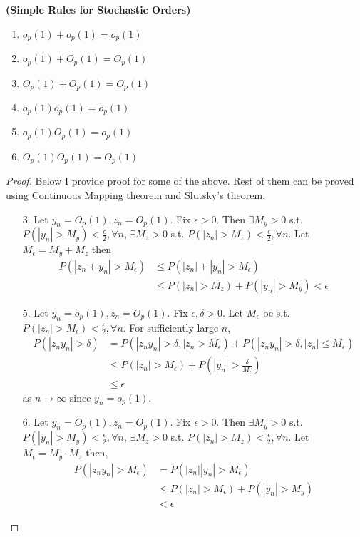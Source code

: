 \documentclass[11pt]{article} %
\theoremstyle{definition}
\numberwithin{defn}{subsection}
\numberwithin{thm}{subsection}
\numberwithin{ex}{subsection}
\newcommand{\ninfty}{n\rightarrow\infty}
\begin{document}
\begin{thm}\label{thm:simplerulesforstochasticorders}
	\textbf{(Simple Rules for Stochastic Orders)}
	\begin{enumerate}
		\item $o_p(1)+o_p(1)=o_p(1)$
		\item $o_p(1)+O_p(1)=O_p(1)$
		\item $O_p(1)+O_p(1)=O_p(1)$
		\item $o_p(1)o_p(1)=o_p(1)$
		\item $o_p(1)O_p(1)=o_p(1)$
		\item $O_p(1)O_p(1)=O_p(1)$
	\end{enumerate}
	\begin{proof}\leavevmode
		Below I provide proof for some of the above. Rest of them can be proved using Continuous Mapping theorem and Slutsky's theorem.
		\begin{itemize}
			\item[3.] Let $y_n=O_p(1),z_n=O_p(1).$ Fix $\epsilon>0$. Then $\exists M_y>0$ s.t. $P(|y_n|>M_y)<\frac{\epsilon}{2},\forall n$, $\exists M_z>0$ s.t. $P(|z_n|>M_z)<\frac{\epsilon}{2},\forall n$. Let $M_{\epsilon}=M_y+M_z$ then
			\begin{align*}
			P(|z_n+y_n|>M_{\epsilon})&\le P(|z_n|+|y_n|>M_{\epsilon})\\
			&\le P(|z_n|>M_z)+P(|y_n|>M_y)<\epsilon
			\end{align*}
			
			\item[5.] Let $y_n=o_p(1),z_n=O_p(1).$ Fix $\epsilon,\delta>0$. Let $M_{\epsilon}$ be s.t. $P(|z_n|>M_{\epsilon})<\frac{\epsilon}{2},\forall n$. For sufficiently large $n$,
			\begin{align*}
			P(|z_ny_n|>\delta)&=P(|z_ny_n|>\delta,|z_n>M_{\epsilon})+P(|z_ny_n|>\delta,|z_n|\le M_{\epsilon})\\
			&\le P(|z_n|>M_{\epsilon})+P(|y_n|>\frac{\delta}{M_{\epsilon}})\\
			&\le \epsilon
			\end{align*}
			as $\ninfty$ since $y_n=o_p(1)$.
			
			\item[6.] Let $y_n=O_p(1),z_n=O_p(1).$ Fix $\epsilon>0$. Then $\exists M_y>0$ s.t. $P(|y_n|>M_y)<\frac{\epsilon}{2},\forall n$, $\exists M_z>0$ s.t. $P(|z_n|>M_z)<\frac{\epsilon}{2},\forall n$. Let $M_{\epsilon}=M_y\cdot M_z$ then,
			\begin{align*}
			P(|z_ny_n|>M_{\epsilon})&=P(|z_n||y_n|>M_{\epsilon})\\
			&\le P(|z_n|>M_{\epsilon})+P(|y_n|>M_y)\\
			&<\epsilon
			\end{align*}
		\end{itemize}
	\end{proof}
\end{thm}
\end{document}
